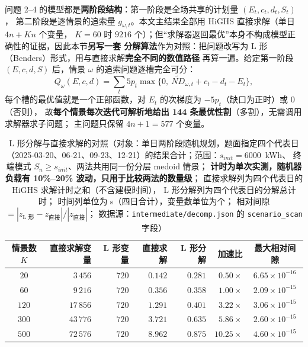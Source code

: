 问题 2--4 的模型都是\textbf{两阶段结构}：第一阶段是全场共享的计划量 $(E_t,c_t,d_t,S_t)$，
第二阶段是逐情景的追索量 $g_{\omega,t}$。本文主结果全部用 HiGHS 直接求解（单日 $4n+Kn$ 个变量，
$K=60$ 时 $9216$ 个）；但“求解器返回最优”本身不构成模型正确性的证据，因此本节\textbf{另写一套
分解算法}作为对照：把问题改写为 L 形（Benders）形式，用与直接求解\textbf{完全不同的数值路径}
再算一遍。给定第一阶段 $(E,c,d,S)$ 后，情景 $\omega$ 的追索问题逐槽完全可分：
\begin{equation}
  Q_\omega(E,c,d)=\sum_t 5p_t\max\bigl\{0,\ \widetilde{ND}_{\omega,t}+c_t-d_t-E_t\bigr\},
  \label{eq:lshape-sub}
\end{equation}
每个槽的最优值就是一个正部函数，对 $E_t$ 的次梯度为 $-5p_t$（缺口为正时）或 $0$（否则），
故\textbf{每个情景每次迭代可解析地给出 144 条最优性割}（多割），无需调用求解器求子问题；
主问题只保留 $4n+1=577$ 个变量。

\begin{table}[htbp]
  \centering
  \caption{L 形分解与直接求解的对照（对象：单日两阶段随机规划，题面指定四个代表日
           （2025-03-20、06-21、09-23、12-21）的结果合计；范围：$s_{init}=6000$~kWh、
           终端模式 $S_n\ge s_{init}$、两法共用同一份分层 medoid 情景；
           \textbf{计时为单次实测，随机器负载有 10\%--20\% 波动，只用于比较两法的数量级}；
           直接求解列为四个代表日的 HiGHS 求解计时之和（不含建模时间），
           L 形分解列为四个代表日的分解总计时；
           时间列单位为 s（四日合计），变量数单位为个；
           相对间隙 $=|z_{\text{L 形}}-z_{\text{直接}}|/|z_{\text{直接}}|$；
           数据源：\texttt{intermediate/decomp.json} 的 \texttt{scenario\_scan} 字段）}
  \label{tab:lshape}
  \small
  \setlength{\tabcolsep}{4pt}
  \begin{tabular}{crrrrrc}
    \toprule
    情景数 $K$ & 直接求解变量 & L 形变量 & 直接求解 & L 形分解 & 加速比 & 最大相对间隙 \\
    \midrule
    $20$  & $3\,456$ & $720$ & $0.142$ & $0.281$ & $0.50\times$ & $6.65\times10^{-16}$ \\
    $60$  & $9\,216$ & $720$ & $0.356$ & $0.358$ & $1.00\times$ & $2.09\times10^{-15}$ \\
    $120$ & $17\,856$ & $720$ & $1.291$ & $0.401$ & $3.22\times$ & $3.06\times10^{-15}$ \\
    $300$ & $43\,776$ & $720$ & $3.721$ & $0.635$ & $5.86\times$ & $2.60\times10^{-15}$ \\
    $500$ & $72\,576$ & $720$ & $8.962$ & $0.875$ & $10.25\times$ & $4.60\times10^{-15}$ \\
    \bottomrule
  \end{tabular}
\end{table}

